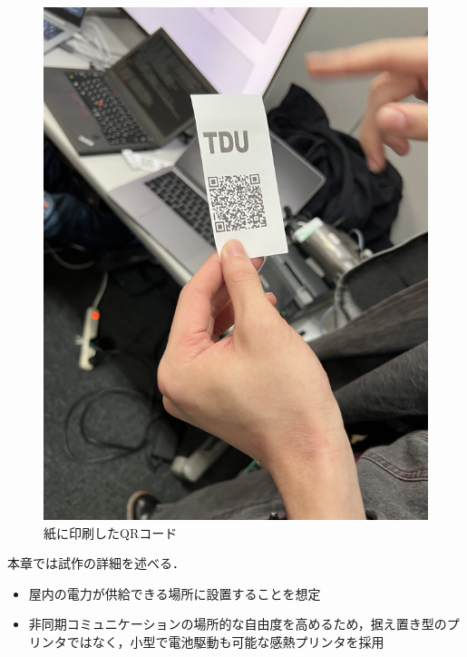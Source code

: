 \documentclass[submit,techrep,noauthor]{ipsj}
\begin{document}
\begin{figure}[tb]
\includegraphics[scale=0.35,bb= 0 0 2000 1000]{image/paper.png}
\caption{紙に印刷したQRコード}
\label{fig:paper}
\end{figure}

本章では試作の詳細を述べる．
\begin{itemize}
    \item 屋内の電力が供給できる場所に設置することを想定
    \item 非同期コミュニケーションの場所的な自由度を高めるため，据え置き型のプリンタではなく，小型で電池駆動も可能な感熱プリンタを採用
\end{itemize}
\end{document}
